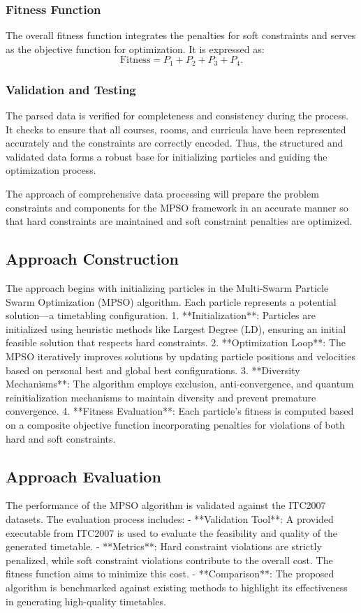 \subsubsection*{Fitness Function}

The overall fitness function integrates the penalties for soft constraints and serves as the objective function for optimization. It is expressed as:
\[
\text{Fitness} = P_1 + P_2 + P_3 + P_4.
\]

\subsubsection*{Validation and Testing}

The parsed data is verified for completeness and consistency during the process. It checks to ensure that all courses, rooms, and curricula have been represented accurately and the constraints are correctly encoded. Thus, the structured and validated data forms a robust base for initializing particles and guiding the optimization process.

The approach of comprehensive data processing will prepare the problem constraints and components for the MPSO framework in an accurate manner so that hard constraints are maintained and soft constraint penalties are optimized.

\subsection{Approach Construction}
\label{subsec:approach_construction}
The approach begins with initializing particles in the Multi-Swarm Particle Swarm Optimization (MPSO) algorithm. Each particle represents a potential solution—a timetabling configuration. 
1. **Initialization**: Particles are initialized using heuristic methods like Largest Degree (LD), ensuring an initial feasible solution that respects hard constraints.
2. **Optimization Loop**: The MPSO iteratively improves solutions by updating particle positions and velocities based on personal best and global best configurations.
3. **Diversity Mechanisms**: The algorithm employs exclusion, anti-convergence, and quantum reinitialization mechanisms to maintain diversity and prevent premature convergence.
4. **Fitness Evaluation**: Each particle’s fitness is computed based on a composite objective function incorporating penalties for violations of both hard and soft constraints.

\subsection{Approach Evaluation}
\label{subsec:approach_evaluation}
The performance of the MPSO algorithm is validated against the ITC2007 datasets. The evaluation process includes:
- **Validation Tool**: A provided executable from ITC2007 is used to evaluate the feasibility and quality of the generated timetable.
- **Metrics**: Hard constraint violations are strictly penalized, while soft constraint violations contribute to the overall cost. The fitness function aims to minimize this cost.
- **Comparison**: The proposed algorithm is benchmarked against existing methods to highlight its effectiveness in generating high-quality timetables.

